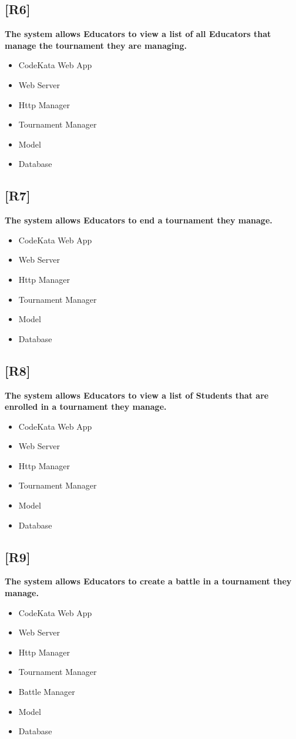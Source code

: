 \documentclass{article}
\begin{document}
\subsection{[R6]}
\textbf{ The system allows Educators to view a list of all Educators that manage the tournament they are managing.}
\begin{itemize}
\item CodeKata Web App
\item Web Server
\item Http Manager
\item Tournament Manager
\item Model
\item Database
\end{itemize}
\subsection{[R7]}
\textbf{ The system allows Educators to end a tournament they manage.}
\begin{itemize}
\item CodeKata Web App
\item Web Server
\item Http Manager
\item Tournament Manager
\item Model
\item Database
\end{itemize}
\subsection{[R8]}
\textbf{ The system allows Educators to view a list of Students that are enrolled in a tournament they manage.}
\begin{itemize}
\item CodeKata Web App
\item Web Server
\item Http Manager
\item Tournament Manager
\item Model
\item Database
\end{itemize}
\subsection{[R9]}
\textbf{ The system allows Educators to create a battle in a tournament they manage.}
\begin{itemize}
\item CodeKata Web App
\item Web Server
\item Http Manager
\item Tournament Manager
\item Battle Manager
\item Model
\item Database
\end{itemize}
\end{document}
